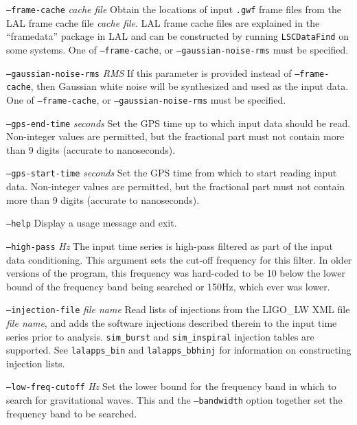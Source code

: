 \documentclass[10pt]{article}
\newcommand{\prog}[1]{\texttt{#1}}
\newcommand{\option}[1]{\texttt{#1}}
\newcommand{\parm}[1]{\textit{#1}}
\newenvironment{entry}%
{\begin{list}{}{\renewcommand{\makelabel}[1]%
{\parbox[b]{\labelwidth}{\makebox[0pt][l]{\textbf{##1}}\\}}%
\setlength{\labelwidth}{1em}%
\setlength{\labelsep}{1em}%
\setlength{\leftmargin}{2em}%
\setlength{\topsep}{\medskipamount}%
\setlength{\itemsep}{\medskipamount}%
\setlength{\parsep}{\medskipamount}%
\setlength{\listparindent}{0pt}}}
{\end{list}}
\begin{document}
\begin{entry}
\begin{entry}
\item[\option{--frame-cache} \parm{cache file}]
Obtain the locations of input \texttt{.gwf} frame files from the LAL frame
cache file \parm{cache file}.  LAL frame cache files are explained in the
``framedata'' package in LAL and can be constructed by running
\prog{LSCDataFind} on some systems.  One of \option{--frame-cache}, or
\option{--gaussian-noise-rms} must be specified.

\item[\option{--gaussian-noise-rms} \parm{RMS}]
If this parameter is provided instead of \option{--frame-cache}, then
Gaussian white noise will be synthesized and used as the input data.  One
of \option{--frame-cache}, or \option{--gaussian-noise-rms} must be
specified.

\item[\option{--gps-end-time} \parm{seconds}]
Set the GPS time up to which input data should be read.  Non-integer values
are permitted, but the fractional part must not contain more than 9 digits
(accurate to nanoseconds).

\item[\option{--gps-start-time} \parm{seconds}]
Set the GPS time from which to start reading input data.  Non-integer
values are permitted, but the fractional part must not contain more than 9
digits (accurate to nanoseconds).

\item[\option{--help}]
Display a usage message and exit.

\item[\option{--high-pass} \parm{Hz}]
The input time series is high-pass filtered as part of the input data
conditioning.  This argument sets the cut-off frequency for this filter.
In older versions of the program, this frequency was hard-coded to be
\unit{10}{\hertz} below the lower bound of the frequency band being
searched or \unit{150}{Hz}, which ever was lower.

\item[\option{--injection-file} \parm{file name}]
Read lists of injections from the LIGO\_LW XML file \parm{file name}, and
adds the software injections described therein to the input time series
prior to analysis.  \verb+sim_burst+ and \verb+sim_inspiral+ injection
tables are supported.  See \prog{lalapps\_bin} and \prog{lalapps\_bbhinj}
for information on constructing injection lists.

\item[\option{--low-freq-cutoff} \parm{Hz}]
Set the lower bound for the frequency band in which to search for
gravitational waves.  This and the \option{--bandwidth} option together set
the frequency band to be searched.


\end{entry}
\end{entry}
\end{document}

